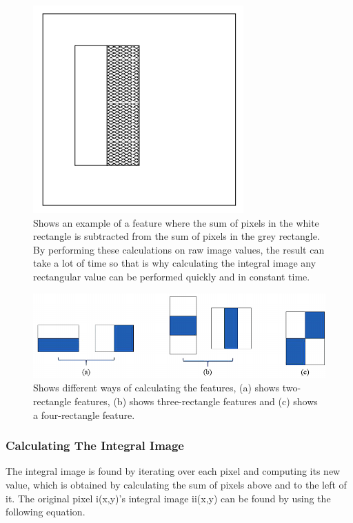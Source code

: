 \documentclass[12pt, letterpaper]{article}
\begin{document}
                \begin{figure}[h]
                \includegraphics[scale=0.3]{sampleOne.png}
                \centering
                \caption{Shows an example of a feature where the sum of
                pixels in the white rectangle is subtracted from the sum
                of pixels in the grey rectangle. By performing these 
                calculations on raw image values, the result can take a
                lot of time so that is why calculating the integral image
                any rectangular value can be performed quickly and in
                constant time.}
                \end{figure}
                \begin{figure}[H]
                    \includegraphics[scale=0.3]{features.png}
                    \centering
                    \caption{ Shows different ways of calculating the 
                    features, (a) shows two-rectangle features, (b) shows
                    three-rectangle features and (c) shows a four-rectangle
                    feature.}
                    
                \end{figure}

            \subsubsection{Calculating The Integral Image}
                The integral image is found by iterating over each pixel
                and computing its new value, which is obtained by
                calculating the sum of pixels above and to the left of it.
                The original pixel i(x,y)’s integral image ii(x,y) can be
                found by using the following equation.
\end{document}
